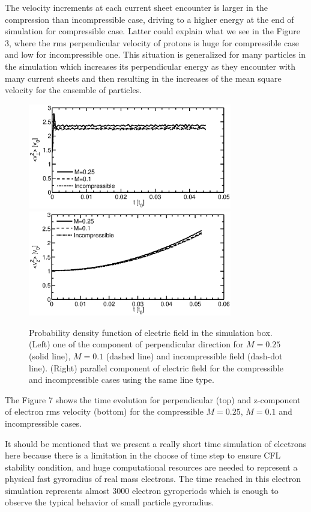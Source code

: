 \documentclass[%
aip,pop,amsmath,amssymb,
 reprint,%
]{revtex4-1}
\begin{document}
The velocity increments at each current sheet encounter is larger in the compression than
incompressible case, driving to a higher energy at the end of simulation for compressible case.
Latter could explain what we see in the Figure 3, where the rms perpendicular velocity of 
protons is huge for compressible case and low for incompressible one. This situation is 
generalized for many particles in the simulation which increases its perpendicular energy as
they encounter with many current sheets and then resulting in the increases of the mean 
square velocity for the ensemble of particles. 

\begin{figure}[<t>]
\begin{center}
{\includegraphics[width = 3.5in]{./Figures/Fig7_a}}
{\includegraphics[width = 3.5in]{./Figures/Fig7_b}}
\caption{Probability density function of electric field in the simulation box. (Left) one of the 
component of perpendicular direction for $M=0.25$ (solid line), $M=0.1$ (dashed line) and incompressible field (dash-dot line). (Right) parallel component of electric field for the compressible and incompressible cases using the same line type.}
\end{center}
\label{mean square velocity}
\end{figure}

The Figure 7 shows the time evolution for perpendicular (top) and z-component of electron
rms velocity (bottom) for the compressible $M=0.25$, $M=0.1$ and incompressible cases.

It should be mentioned that we present a really short time simulation of electrons here
because there is a limitation in the choose of time step to ensure CFL stability condition,
and huge computational resources are needed to represent a physical fast gyroradius of real
mass electrons. The time reached in this electron simulation represents almost 3000 
electron gyroperiods which is enough to observe the typical behavior of small particle 
gyroradius.
\end{document}
